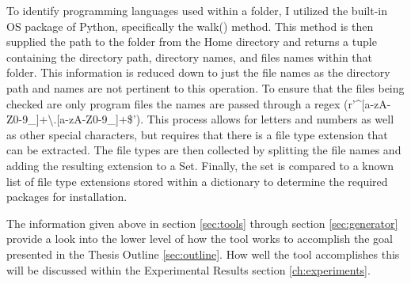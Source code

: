 To identify programming languages used within a folder, I utilized the built-in OS package of Python, specifically the walk() method. This method is then supplied the path to the folder from the Home directory and returns a tuple containing the directory path, directory names, and files names within that folder. This information is reduced down to just the file names as the directory path and names are not pertinent to this operation. To ensure that the files being checked are only program files the names are passed through a regex (r'\textasciicircum[a-zA-Z0-9\_]+\textbackslash.[a-zA-Z0-9\_]+\$'). This process allows for letters and numbers as well as other special characters, but requires that there is a file type extension that can be extracted. The file types are then collected by splitting the file names and adding the resulting extension to a Set. Finally, the set is compared to a known list of file type extensions stored within a dictionary to determine the required packages for installation.

The information given above in section \ref{sec:tools} through section \ref{sec:generator} provide a look into the lower level of how the tool works to accomplish the goal presented in the Thesis Outline \ref{sec:outline}. How well the tool accomplishes this will be discussed within the Experimental Results section \ref{ch:experiments}.
